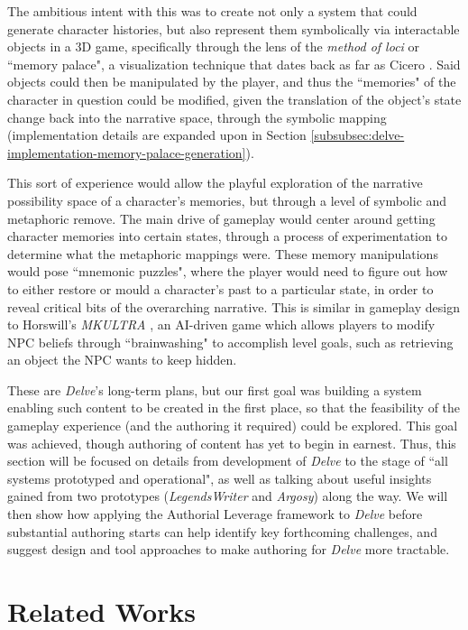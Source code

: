 The ambitious intent with this was to create not only a system that could generate character histories, but also represent them symbolically via interactable objects in a 3D game, specifically through the lens of the \textit{method of loci} or ``memory palace", a visualization technique that dates back as far as Cicero \cite{Herrmann1988}. Said objects could then be manipulated by the player, and thus the ``memories" of the character in question could be modified, given the translation of the object's state change back into the narrative space, through the symbolic mapping (implementation details are expanded upon in Section \ref{subsubsec:delve-implementation-memory-palace-generation}).

This sort of experience would allow the playful exploration of the narrative possibility space of a character's memories, but through a level of symbolic and metaphoric remove. The main drive of gameplay would center around getting character memories into certain states, through a process of experimentation to determine what the metaphoric mappings were. These memory manipulations would pose ``mnemonic puzzles", where the player would need to figure out how to either restore or mould a character's past to a particular state, in order to reveal critical bits of the overarching narrative. This is similar in gameplay design to Horswill's \textit{MKULTRA} \cite{horswill_MKULTRA}, an AI-driven game which allows players to modify NPC beliefs through ``brainwashing" to accomplish level goals, such as retrieving an object the NPC wants to keep hidden.

These are \textit{Delve}'s long-term plans, but our first goal was building a system enabling such content to be created in the first place, so that the feasibility of the gameplay experience (and the authoring it required) could be explored. This goal was achieved, though authoring of content has yet to begin in earnest. Thus, this section will be focused on details from development of \textit{Delve} to the stage of ``all systems prototyped and operational", as well as talking about useful insights gained from two prototypes (\textit{LegendsWriter} and \textit{Argosy}) along the way. We will then show how applying the Authorial Leverage framework to \textit{Delve} before substantial authoring starts can help identify key forthcoming challenges, and suggest design and tool approaches to make authoring for \textit{Delve} more tractable.

\section{Related Works}\label{sec:delve-related-works}


